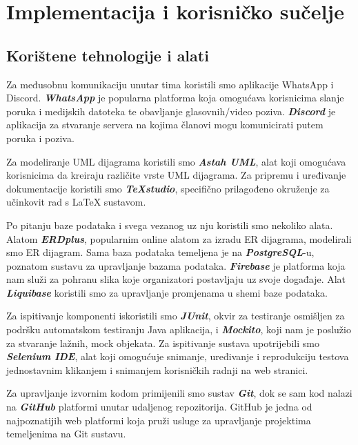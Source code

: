 \chapter{Implementacija i korisničko sučelje}
		
		
		\section{Korištene tehnologije i alati}
		
			Za međusobnu komunikaciju unutar tima koristili smo aplikacije WhatsApp i Discord. \textbf{\textit{WhatsApp}} je popularna platforma koja omogućava korisnicima slanje poruka i medijskih datoteka te obavljanje glasovnih/video poziva. \textbf{\textit{Discord}} je aplikacija za stvaranje servera na kojima članovi mogu komunicirati putem poruka i poziva. 
			
			Za modeliranje UML dijagrama koristili smo \textbf{\textit{Astah UML}}, alat koji omogućava korisnicima da kreiraju različite vrste UML dijagrama. Za pripremu i uređivanje dokumentacije koristili smo \textbf{\textit{TeXstudio}}, specifično prilagođeno okruženje za učinkovit rad s LaTeX sustavom.
			
			Po pitanju baze podataka i svega vezanog uz nju koristili smo nekoliko alata. Alatom \textbf{\textit{ERDplus}}, popularnim online alatom za izradu ER dijagrama, modelirali smo ER dijagram. Sama baza podataka temeljena je na \textbf{\textit{PostgreSQL}}-u, poznatom sustavu za upravljanje bazama podataka. \textbf{\textit{Firebase}} je platforma koja nam služi za pohranu slika koje organizatori postavljaju uz svoje događaje. Alat \textbf{\textit{Liquibase}} koristili smo za upravljanje promjenama u shemi baze podataka.
			
			Za ispitivanje komponenti iskoristili smo \textbf{\textit{JUnit}}, okvir za testiranje osmišljen za podršku automatskom testiranju Java aplikacija, i \textbf{\textit{Mockito}}, koji nam je poslužio za stvaranje lažnih, mock objekata. Za ispitivanje sustava upotrijebili smo \textbf{\textit{Selenium IDE}}, alat koji omogućuje snimanje, uređivanje i reprodukciju testova jednostavnim klikanjem i snimanjem korisničkih radnji na web stranici.
			
			Za upravljanje izvornim kodom primijenili smo sustav \textbf{\textit{Git}}, dok se sam kod nalazi na \textbf{\textit{GitHub}} platformi unutar udaljenog repozitorija. GitHub je jedna od najpoznatijih web platformi koja pruži usluge za upravljanje projektima temeljenima na Git sustavu.  
			
